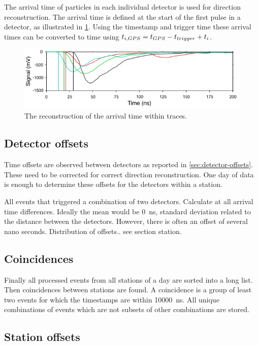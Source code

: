 The arrival time of particles in each individual detector is used for direction  reconstruction. The arrival time is defined at the start of the first pulse in a detector, as illustrated in \cref{fig:arrival_time}. Using the \gps timestamp and trigger time these arrival times can be converted to \gps time using $t_{i,\gps} = t_{\gps} - t_{trigger} + t_i$.

\begin{figure}
    \centering
    \includegraphics[width=0.7\linewidth]{plots/processing/arrival_time.png}
    \caption{The reconstruction of the arrival time within traces.}
    \label{fig:arrival_time}
\end{figure}


\subsection{Detector offsets}

Time offsets are observed between detectors as reported in \cref{sec:detector-offsets}. These need to be corrected for correct direction reconstruction. One day of data is enough to determine these offsets for the detectors within a station.

All events that triggered a combination of two detectors. Calculate at all arrival time differences. Ideally the mean would be \SI{0}{\ns}, standard deviation related to the distance between the detectors. However, there is often an offset of several nano seconds. Distribution of offsets.. see section station.


\subsection{Coincidences}

Finally all processed events from all stations of a day are sorted into a long list. Then coincidences between stations are found. A coincidence is a group of least two events for which the \gps timestamps are within \SI{10000}{\ns}. All unique combinations of events which are not subsets of other combinations are stored.


\subsection{Station offsets}

